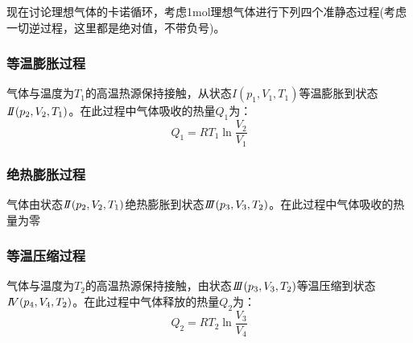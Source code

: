 \documentclass[oneside]{ctexbook}
\begin{document}
现在讨论理想气体的卡诺循环，考虑1mol理想气体进行下列四个准静态过程(考虑一切逆过程，这里都是绝对值，不带负号)。

\begin{figure}[htbp]%
    \centering
\end{figure}

\subsubsection{等温膨胀过程}%

气体与温度为\(T_1\)的高温热源保持接触，从状态\(I(p_1,V_1,T_1)\)等温膨胀到状态\(I\hspace{-0.1cm}I(p_2,V_2,T_1)\)。在此过程中气体吸收的热量\(Q_1\)为：
\begin{equation}
Q_1=RT_1\ln\dfrac{V_2}{V_1}
\end{equation}

\subsubsection{绝热膨胀过程}

气体由状态\(I\hspace{-0.1cm}I(p_2,V_2,T_1)\)绝热膨胀到状态\(I\hspace{-0.1cm}I\hspace{-0.1cm}I(p_3,V_3,T_2)\)。在此过程中气体吸收的热量为零

\subsubsection{等温压缩过程}

气体与温度为\(T_2\)的高温热源保持接触，由状态\(I\hspace{-0.1cm}I\hspace{-0.1cm}I(p_3,V_3,T_2)\)等温压缩到状态\(I\hspace{-0.08cm}V(p_4,V_4,T_2)\)。在此过程中气体释放的热量\(Q_2\)为：
\begin{equation}
Q_2=RT_2\ln\dfrac{V_3}{V_4}
\end{equation}
\end{document}
